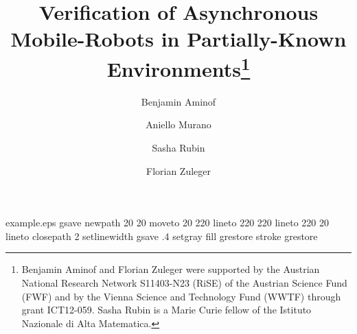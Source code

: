 \begin{filecontents*}{example.eps}
gsave
newpath
  20 20 moveto
  20 220 lineto
  220 220 lineto
  220 20 lineto
closepath
2 setlinewidth
gsave
  .4 setgray fill
grestore
stroke
grestore
\end{filecontents*}

\RequirePackage{fix-cm}
\documentclass[smallcondensed]{svjour3}     %

\smartqed  %
\usepackage{graphicx}




\title{Verification of Asynchronous Mobile-Robots in Partially-Known Environments\thanks{Benjamin Aminof and Florian Zuleger were supported by the Austrian National Research Network S11403-N23 (RiSE) of the Austrian Science Fund (FWF) and by the Vienna Science and Technology Fund (WWTF) through grant ICT12-059.  Sasha Rubin is a Marie Curie fellow of the Istituto Nazionale di Alta Matematica.}}



\author{Benjamin Aminof \and Aniello Murano \and Sasha Rubin \and Florian Zuleger}



